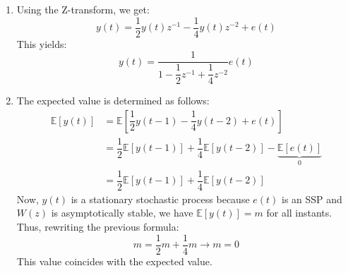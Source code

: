 \begin{enumerate}
    \item Using the Z-transform, we get:
        \[y(t)=\dfrac{1}{2}y(t)z^{-1}-\dfrac{1}{4}y(t)z^{-2}+e(t)\]
        This yields:
        \[y(t)=\dfrac{1}{1-\dfrac{1}{2}z^{-1}+\dfrac{1}{4}z^{-2}}e(t)\]
    \item The expected value is determined as follows:
        \begin{align*}
            \mathbb{E}\left[y(t)\right]     &= \mathbb{E}\left[\dfrac{1}{2}y(t-1)-\dfrac{1}{4}y(t-2)+e(t)\right] \\
                                            &= \dfrac{1}{2}\mathbb{E}\left[y(t-1)\right] +\dfrac{1}{4}\mathbb{E}\left[y(t-2)\right]-\underbrace{\mathbb{E}\left[e(t)\right]}_0 \\
                                            &= \dfrac{1}{2}\mathbb{E}\left[y(t-1)\right] +\dfrac{1}{4}\mathbb{E}\left[y(t-2)\right]
        \end{align*}
        Now, $y(t)$ is a stationary stochastic process because $e(t)$ is an SSP and $W(z)$ is asymptotically stable, we have $\mathbb{E}\left[y(t)\right]=m$ for all instants. 
        Thus, rewriting the previous formula:
        \[m=\dfrac{1}{2}m +\dfrac{1}{4}m\rightarrow m=0\]
        This value coincides with the expected value.


\end{enumerate}

